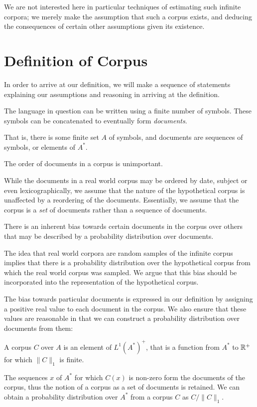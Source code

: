 \documentclass[12pt]{report}
\begin{document}
We are not interested here in particular techniques of estimating such infinite corpora; we merely make the assumption that such a corpus exists, and deducing the consequences of certain other assumptions given its existence.


\section{Definition of Corpus}


In order to arrive at our definition, we will make a sequence of statements explaining our assumptions and reasoning in arriving at the definition.


\begin{assumption}The language in question can be written using a finite number of symbols. These symbols can be concatenated to eventually form \emph{documents}.\end{assumption}\noindent
That is, there is some finite set $A$ of symbols, and documents are sequences of symbols, or elements of $A^*$.

\begin{assumption} The order of documents in a corpus is unimportant.\end{assumption} \noindent
While the documents in a real world corpus may be ordered by date, subject or even lexicographically, we assume that the nature of the hypothetical corpus is unaffected by a reordering of the documents. Essentially, we assume that the corpus is a \emph{set} of documents rather than a sequence of documents.


\begin{assumption}There is an inherent bias towards certain documents in the corpus over others that may be described by a probability distribution over documents.\end{assumption} \noindent
The idea that real world corpora are random samples of the infinite corpus implies that there is a probability distribution over the hypothetical corpus from which the real world corpus was sampled. We argue that this bias should be incorporated into the representation of the hypothetical corpus.

The bias towards particular documents is expressed in our definition by assigning a positive real value to each document in the corpus. We also ensure that these values are reasonable in that we can construct a probability distribution over documents from them:
\begin{defn}[Corpus]
A corpus $C$ over $A$ is an element of $L^1(A^*)^+$, that is a function from $A^*$ to $\mathbb{R}^+$ for which $\|C\|_1$ is finite. 
\end{defn}\noindent
The sequences $x$ of $A^*$ for which $C(x)$ is non-zero form the documents of the corpus, thus the notion of a corpus as a set of documents is retained. We can obtain a probability distribution over $A^*$ from a corpus $C$ as $C/\|C\|_1$.
\end{document}
